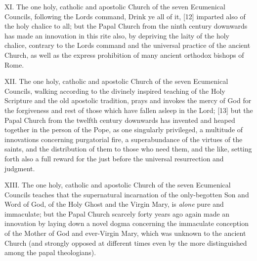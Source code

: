 XI. The one holy, catholic and apostolic Church of the seven Ecumenical
Councils, following the Lord\textquotesingle s command,
\textquotesingle Drink ye all of it,\textquotesingle{} {[}12{]} imparted
also of the holy chalice to all; but the Papal Church from the ninth
century downwards has made an innovation in this rite also, by depriving
the laity of the holy chalice, contrary to the Lord\textquotesingle s
command and the universal practice of the ancient Church, as well as the
express prohibition of many ancient orthodox bishops of Rome.

XII. The one holy, catholic and apostolic Church of the seven Ecumenical
Councils, walking according to the divinely inspired teaching of the
Holy Scripture and the old apostolic tradition, prays and invokes the
mercy of God for the forgiveness and rest of those
\textquotesingle which have fallen asleep in the Lord\textquotesingle;
{[}13{]} but the Papal Church from the twelfth century downwards has
invented and heaped together in the person of the Pope, as one
singularly privileged, a multitude of innovations concerning purgatorial
fire, a superabundance of the virtues of the saints, and the
distribution of them to those who need them, and the like, setting forth
also a full reward for the just before the universal resurrection and
judgment.

XIII. The one holy, catholic and apostolic Church of the seven
Ecumenical Councils teaches that the supernatural incarnation of the
only-begotten Son and Word of God, of the Holy Ghost and the Virgin
Mary, is \emph{alone} pure and immaculate; but the Papal Church scarcely
forty years ago again made an innovation by laying down a novel dogma
concerning the immaculate conception of the Mother of God and
ever-Virgin Mary, which was unknown to the ancient Church (and strongly
opposed at different times even by the more distinguished among the
papal theologians).

